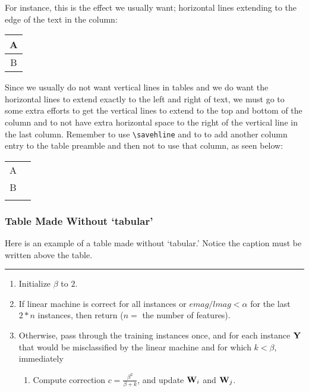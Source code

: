 \begin{article}
For instance, this is the effect we usually want; 
horizontal lines extending to
the edge of the text in the column:


\begin{table}[h]
\begin{tabular}{c}\hline
 A         \\ \hline
 B         \\ \hline
\end{tabular}
\end{table}


Since we usually do not want vertical
lines in tables and we do want the horizontal lines to extend
exactly to the left and right of text, 
we must go to some extra efforts to get the vertical lines
to extend to the top and bottom of the column and to not
have extra horizontal space to the right of the vertical line
in the last column.
Remember to
use \verb+\savehline+ and to
to add another column entry to the table preamble
and then not to use that column, as seen below:

\begin{table}[h]
\begin{tabular}{|c|c}\savehline
 A         \\ \savehline
 B         \\ \savehline
\end{tabular}
\end{table}

\newpage

\subsubsection{Table Made Without `tabular'}
Here is an example of a table made without `tabular.' Notice
the caption must be written above the table.

\begin{specialtable}[h]
\caption{Training a Thermal Linear Machine.}
\label{thermal-alg}
\hrule
\vskip3pt
\begin{enumerate}
  \item Initialize $\beta$ to $2$.

  \item If linear machine is correct for all instances or 
$emag/lmag < \alpha$ for the last $2*n$ instances, then return
($n =$ the number of features).

  \item Otherwise, pass through the training instances once, and for each 
instance ${\bf Y}$ that	would be misclassified by the linear machine and 
for which $k < \beta$, immediately
	\begin{enumerate}
	  \item Compute correction $c = \frac{\beta^{2}}{\beta+k}$, and update
${\bf W}_{i}$ and  ${\bf W}_{j}$.


\end{enumerate}
\end{enumerate}
\end{specialtable}
\end{article}
